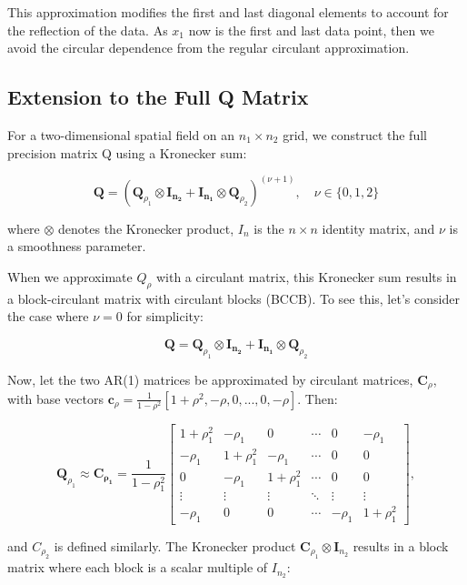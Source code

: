\documentclass[
  12pt]{article}
\begin{document}
This approximation modifies the first and last diagonal elements to
account for the reflection of the data. As \(x_1\) now is the first and
last data point, then we avoid the circular dependence from the regular
circulant approximation.

\subsection{Extension to the Full Q
Matrix}\label{extension-to-the-full-q-matrix}

For a two-dimensional spatial field on an \(n_1 \times n_2\) grid, we
construct the full precision matrix Q using a Kronecker sum:

\[
\mathbf{Q} = \left( \mathbf{Q}_{\rho_1} \otimes \mathbf{I_{n_2}} + \mathbf{I_{n_1}} \otimes \mathbf{Q}_{\rho_2} \right)^{(\nu + 1)}, \quad \nu \in \{0, 1, 2\}
\]

where \(\otimes\) denotes the Kronecker product, \(I_n\) is the
\(n \times n\) identity matrix, and \(\nu\) is a smoothness parameter.

When we approximate \(Q_\rho\) with a circulant matrix, this Kronecker
sum results in a block-circulant matrix with circulant blocks (BCCB). To
see this, let's consider the case where \(\nu = 0\) for simplicity:

\[
\mathbf{Q} = \mathbf{Q}_{\rho_1} \otimes \mathbf{I_{n_2}} + \mathbf{I_{n_1}} \otimes \mathbf{Q}_{\rho_2}
\]

Now, let the two AR(1) matrices be approximated by circulant matrices,
\(\mathbf C_\rho\), with base vectors
\(\mathbf c_\rho = \frac{1}{1-\rho^2}\left[1+\rho^2, -\rho, 0, ..., 0, -\rho \right]\).
Then:

\[
\mathbf{Q}_{\rho_1} \approx \mathbf{C_{\rho_1}} = \frac{1}{1-\rho_1^2}
\begin{bmatrix}
1+\rho_1^2 & -\rho_1 & 0 & \cdots & 0 & -\rho_1 \\
-\rho_1 & 1+\rho_1^2 & -\rho_1 & \cdots & 0 & 0 \\
0 & -\rho_1 & 1+\rho_1^2 & \cdots & 0 & 0 \\
\vdots & \vdots & \vdots & \ddots & \vdots & \vdots \\
-\rho_1 & 0 & 0 & \cdots & -\rho_1 & 1+\rho_1^2
\end{bmatrix},
\]

and \(C_{\rho_2}\) is defined similarly. The Kronecker product
\(\mathbf C_{\rho_1} \otimes \mathbf I_{n_2}\) results in a block matrix
where each block is a scalar multiple of \(I_{n_2}\):
\end{document}
